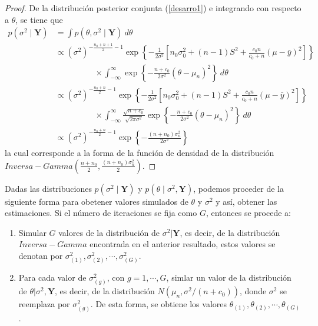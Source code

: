 \documentclass[10pt,openright]{book}\usepackage[]{graphicx}\usepackage[]{color}
\begin{document}
\begin{proof}
De la distribuci\'on posterior conjunta (\ref{desarro1}) e integrando con respecto a $\theta$, se tiene que
\begin{align*}
p(\sigma^2 \mid \mathbf{Y})&=\int p(\theta,\sigma^2 \mid \mathbf{Y}) \ d\theta\\
&\propto (\sigma^2)^{-\frac{n_0+n+1}{2}-1}
\exp\left\{-\frac{1}{2\sigma^2}\left[n_0\sigma^2_0+(n-1)S^2+\frac{c_0n}{c_0+n}(\mu-\bar{y})^2\right]\right\}\\
&\hspace{2cm}\times
\int_{-\infty}^{\infty}\exp\left\{-\frac{n+c_0}{2\sigma^2}(\theta-\mu_n)^2\right\} \ d\theta\\
&\propto (\sigma^2)^{-\frac{n_0+n}{2}-1}
\exp\left\{-\frac{1}{2\sigma^2}\left[n_0\sigma^2_0+(n-1)S^2+\frac{c_0n}{c_0+n}(\mu-\bar{y})^2\right]\right\}\\
&\hspace{2cm}\times
\int_{-\infty}^{\infty}\frac{\sqrt{n+c_0}}{\sqrt{2\pi\sigma^2}}
\exp\left\{-\frac{n+c_0}{2\sigma^2}(\theta-\mu_n)^2\right\} \ d\theta\\
&\propto (\sigma^2)^{-\frac{n_0+n}{2}-1}
\exp\left\{-\frac{(n+n_0)\sigma^2_n}{2\sigma^2}\right\}
\end{align*}
la cual corresponde a la forma de la funci\'on de densidad de la distribuci\'on $Inversa-Gamma(\frac{n+n_0}{2},\frac{(n+n_0)\sigma^2_n}{2})$.
\end{proof}

Dadas las distribuciones $p(\sigma^2\mid \mathbf{Y})$ y $p(\theta\mid \sigma^2, \mathbf{Y})$, podemos proceder de la siguiente forma para obetener valores simulados de $\theta$ y $\sigma^2$ y as\'i, obtener las estimaciones. Si el n\'umero de iteraciones se fija como $G$, entonces se procede a:

\begin{enumerate}[(1)]
\item Simular $G$ valores de la distribuci\'on de $\sigma^2|\mathbf{Y}$, es decir, de la distribuci\'on $Inversa-Gamma$ encontrada en el anterior resultado, estos valores se denotan por $\sigma^2_{(1)},\sigma^2_{(2)},\cdots,\sigma^2_{(G)}$.
\item  Para cada valor de $\sigma^2_{(g)}$, con $g=1,\cdots,G$, simlar un valor de la distribuci\'on de $\theta|\sigma^2,\mathbf{Y}$, es decir, de la distribuci\'on $N(\mu_n,\sigma^2/(n+c_0))$, donde $\sigma^2$ se reemplaza por $\sigma^2_{(g)}$. De esta forma, se obtiene los valores $\theta_{(1)},\theta_{(2)},\cdots,\theta_{(G)}$.
\end{enumerate}
\end{document}
